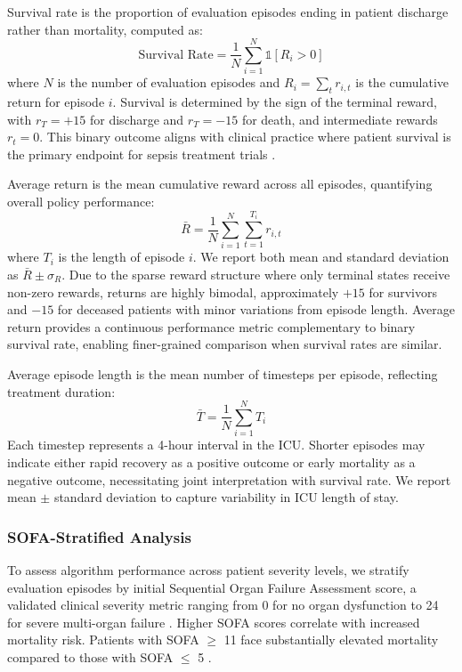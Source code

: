 Survival rate is the proportion of evaluation episodes ending in patient discharge rather than mortality, computed as:
\begin{equation}
\text{Survival Rate} = \frac{1}{N} \sum_{i=1}^N \mathbb{1}[R_i > 0]
\end{equation}
where $N$ is the number of evaluation episodes and $R_i = \sum_t r_{i,t}$ is the cumulative return for episode $i$. Survival is determined by the sign of the terminal reward, with $r_T = +15$ for discharge and $r_T = -15$ for death, and intermediate rewards $r_t = 0$. This binary outcome aligns with clinical practice where patient survival is the primary endpoint for sepsis treatment trials \citep{seymour2017sepsis_criteria}.

Average return is the mean cumulative reward across all episodes, quantifying overall policy performance:
\begin{equation}
\bar{R} = \frac{1}{N} \sum_{i=1}^N \sum_{t=1}^{T_i} r_{i,t}
\end{equation}
where $T_i$ is the length of episode $i$. We report both mean and standard deviation as $\bar{R} \pm \sigma_R$. Due to the sparse reward structure where only terminal states receive non-zero rewards, returns are highly bimodal, approximately $+15$ for survivors and $-15$ for deceased patients with minor variations from episode length. Average return provides a continuous performance metric complementary to binary survival rate, enabling finer-grained comparison when survival rates are similar.

Average episode length is the mean number of timesteps per episode, reflecting treatment duration:
\begin{equation}
\bar{T} = \frac{1}{N} \sum_{i=1}^N T_i
\end{equation}
Each timestep represents a 4-hour interval in the ICU. Shorter episodes may indicate either rapid recovery as a positive outcome or early mortality as a negative outcome, necessitating joint interpretation with survival rate. We report mean $\pm$ standard deviation to capture variability in ICU length of stay.

\subsubsection{SOFA-Stratified Analysis}

To assess algorithm performance across patient severity levels, we stratify evaluation episodes by initial Sequential Organ Failure Assessment score, a validated clinical severity metric ranging from 0 for no organ dysfunction to 24 for severe multi-organ failure \citep{vincent1996sofa}. Higher SOFA scores correlate with increased mortality risk. Patients with SOFA $\geq$ 11 face substantially elevated mortality compared to those with SOFA $\leq$ 5 \citep{seymour2017sepsis_criteria}.

